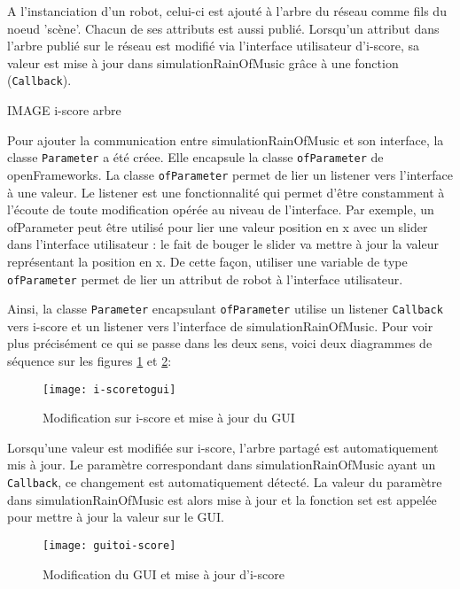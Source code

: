 A l'instanciation d'un robot, celui-ci est ajouté à l'arbre du réseau comme fils du noeud 'scène'. Chacun de ses attributs est aussi publié. Lorsqu'un attribut dans l'arbre publié sur le réseau est modifié via l'interface utilisateur d'i-score, sa valeur est mise à jour dans simulationRainOfMusic grâce à une fonction (\verb|Callback|).

IMAGE i-score arbre

Pour ajouter la communication entre simulationRainOfMusic et son interface, la classe \verb|Parameter| a été créee. Elle encapsule la classe \verb|ofParameter| de openFrameworks. La classe \verb|ofParameter| permet de lier un listener vers l'interface à une valeur. Le listener est une fonctionnalité qui permet d'être constamment à l'écoute de toute modification opérée au niveau de l'interface. Par exemple, un ofParameter peut être utilisé pour lier une valeur position en x avec un slider dans l'interface utilisateur : le fait de bouger le slider va mettre à jour la valeur représentant la position en x. De cette façon, utiliser une variable de type \verb|ofParameter| permet de lier un attribut de robot à l'interface utilisateur. 

Ainsi, la classe \verb|Parameter| encapsulant \verb|ofParameter| utilise un listener \verb|Callback| vers i-score et un listener vers l'interface de simulationRainOfMusic. Pour voir plus précisément ce qui se passe dans les deux sens, voici deux diagrammes de séquence sur les figures \ref{diag1} et \ref{diag2}:

\begin{figure}[H]
\begin{center}
\texttt{[image: i-scoretogui]}
\caption{Modification sur i-score et mise à jour du GUI}
\label{diag1}
\end{center}
\end{figure}

Lorsqu'une valeur est modifiée sur i-score, l'arbre partagé est automatiquement mis à jour. Le paramètre correspondant dans simulationRainOfMusic ayant un \verb|Callback|, ce changement est automatiquement détecté. La valeur du paramètre dans simulationRainOfMusic est alors mise à jour et la fonction set est appelée pour mettre à jour la valeur sur le GUI.

\begin{figure}[H]
\begin{center}
\texttt{[image: guitoi-score]}
\caption{Modification du GUI et mise à jour d'i-score}
\label{diag2}
\end{center}
\end{figure}

